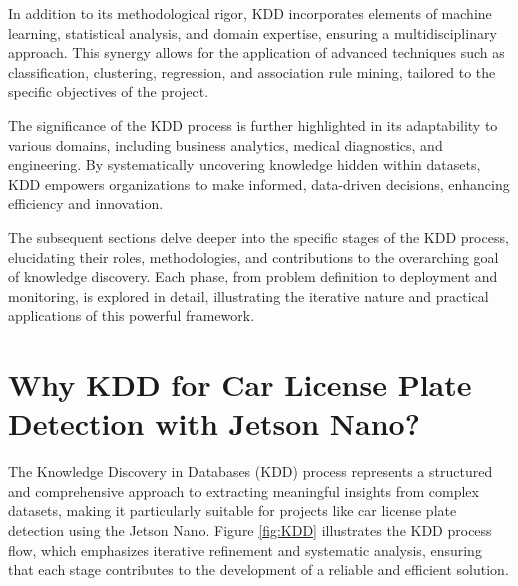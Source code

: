 In addition to its methodological rigor, KDD incorporates elements of machine learning, statistical analysis, and domain expertise, ensuring a multidisciplinary approach. This synergy allows for the application of advanced techniques such as classification, clustering, regression, and association rule mining, tailored to the specific objectives of the project.

The significance of the KDD process is further highlighted in its adaptability to various domains, including business analytics, medical diagnostics, and engineering. By systematically uncovering knowledge hidden within datasets, KDD empowers organizations to make informed, data-driven decisions, enhancing efficiency and innovation.

The subsequent sections delve deeper into the specific stages of the KDD process, elucidating their roles, methodologies, and contributions to the overarching goal of knowledge discovery. Each phase, from problem definition to deployment and monitoring, is explored in detail, illustrating the iterative nature and practical applications of this powerful framework.




\section{Why KDD for Car License Plate Detection with Jetson Nano?}

The Knowledge Discovery in Databases (KDD) process represents a structured and comprehensive approach to extracting meaningful insights from complex datasets, making it particularly suitable for projects like car license plate detection using the Jetson Nano. Figure \ref{fig:KDD} illustrates the KDD process flow, which emphasizes iterative refinement and systematic analysis, ensuring that each stage contributes to the development of a reliable and efficient solution.
\vspace{0.5cm}



